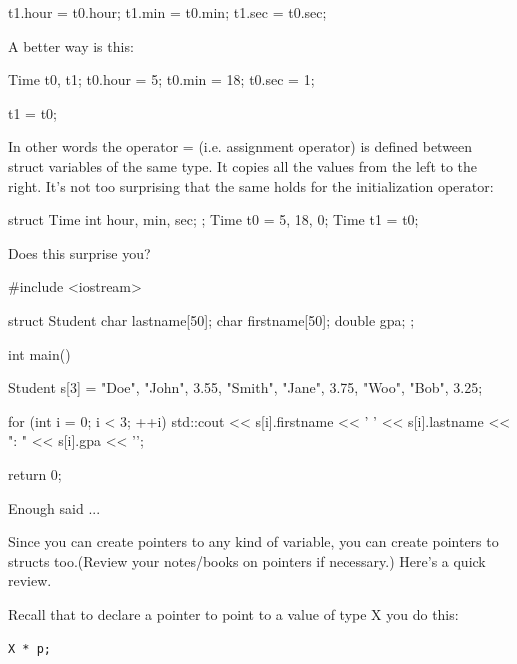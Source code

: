 \begin{center}
\begin{center}
\begin{consolethree}[escapeinside=||]
t1.hour = t0.hour;
t1.min = t0.min;
t1.sec = t0.sec;
\end{consolethree}

A better way is this:

\begin{consolethree}[escapeinside=||]
Time t0, t1;
t0.hour = 5;
t0.min = 18;
t0.sec = 1;

t1 = t0;
\end{consolethree}

In other words the operator = (i.e. assignment operator) is defined
between struct variables of the same type. It copies all the values from
the left to the right. It's not too surprising that the same holds for the
initialization operator:

\begin{consolethree}[escapeinside=||]
struct Time
{
  int hour, min, sec;
};
Time t0 = {5, 18, 0};
Time t1 = t0;
\end{consolethree}





\newpage{}

Does this surprise you?

\begin{consolethree}[escapeinside=||]
#include <iostream>

struct Student
{
    char lastname[50];
    char firstname[50];
    double gpa;
};

int main()
{
    Student s[3] = {{"Doe", "John", 3.55},
                    {"Smith", "Jane", 3.75},
                    {"Woo", "Bob", 3.25}};

    for (int i = 0; i < 3; ++i)
    {
        std::cout << s[i].firstname << ' '
                  << s[i].lastname << ": "
                  << s[i].gpa << '\n';
    }

    return 0;
}
\end{consolethree}

Enough said ...


\newpage{}

Since you can create pointers to any kind of variable, you can create
pointers to structs too.(Review your notes/books on pointers if
necessary.) Here's a quick review.

Recall that to declare a pointer to point to a value of type X you do this:

\verb!X * p;!


\end{center}
\end{center}
